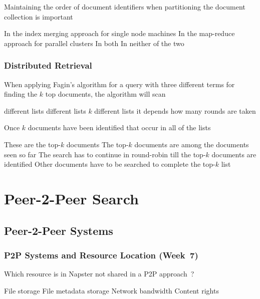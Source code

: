 \documentclass[12pt,a4paper]{exam} %
\begin{document}
\begin{flushleft}
\begin{multicols*}{2}
\begin{questions}
\question Maintaining the order of document identifiers when partitioning the document collection is important
\begin{checkboxes}
\CorrectChoice In the index merging approach for single node machines
\choice In the map-reduce approach for parallel clusters
\choice In both
\choice In neither of the two
\end{checkboxes}


\subsubsection{Distributed Retrieval}

\question When applying Fagin’s algorithm for a query with three different terms for finding the $k$ top documents, the algorithm will scan
\begin{checkboxes}
 different lists
 different lists
\choice $k$ different lists
\choice it depends how many rounds are taken
\end{checkboxes}

\question Once $k$ documents have been identified that occur in all of the lists
\begin{checkboxes}
\choice These are the top-$k$ documents
\CorrectChoice The top-$k$ documents are among the documents seen so far
\choice The search has to continue in round-robin till the top-$k$ documents are identified
\choice Other documents have to be searched to complete the top-$k$ list
\end{checkboxes}


\section{Peer-2-Peer Search}
\subsection{Peer-2-Peer Systems}
\subsubsection{P2P Systems and Resource Location (Week~7)}

\question Which resource is in Napster not shared in a P2P approach~?
\begin{checkboxes}
\choice File storage
\CorrectChoice File metadata storage
\choice Network bandwidth
\choice Content rights
\end{checkboxes}


\end{questions}
\end{multicols*}
\end{flushleft}
\end{document}
